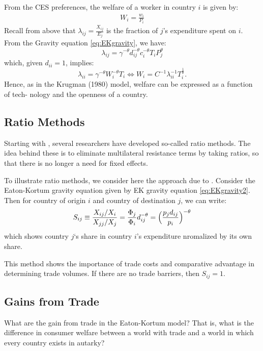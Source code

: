 From the CES preferences, the welfare of a worker in country $i$ is given by:
\begin{gather}
    W_i = \frac{w_i}{P_i} \label{eq:EKwelfare}
\end{gather}
Recall from above that $\lambda_{ij} = \frac{X_{ij}}{E_j}$ is the fraction of $j$'s expenditure spent on $i$.
From the Gravity equation \ref{eq:EKgravity}, we have:
\[
\lambda_{ij} = \gamma^{-\theta} d_{ij}^{-\theta} c_i^{-\theta} T_i P_j^{\theta}
\]
which, given $d_{ii}=1$, implies:
\[
\lambda_{ii} = \gamma^{-\theta} W_i^{-\theta} T_i \Leftrightarrow W_i = C^{-1} \lambda_{ii}^{-1} T_i^{\frac{1}{\theta}}. \label{eq:EKgravity2}
\]
Hence, as in the Krugman (1980)\cite{krugman1980scale} model, welfare can be expressed as a function of tech-
nology and the openness of a country. 

\subsection{Ratio Methods}

Starting with \cite{head1999rationalization}, several researchers have developed so-called
ratio methods. The idea behind these is to eliminate multilateral resistance terms by taking ratios, so
that there is no longer a need for fixed effects. 

To illustrate ratio methods, we consider here the approach due to \cite{romalis2007nafta}.
Consider the Eaton-Kortum gravity equation given by EK gravity equation \ref{eq:EKgravity2}.
Then for country of origin $i$ and country of destination $j$, we can write:
\[
S_{ij} \equiv \frac{X_{ij} / X_i}{X_{jj} / X_j} = \frac{\Phi_j}{\Phi_i} d_{ij}^{-\theta} = \Bigl( \frac{p_j d_{ij}}{p_i} \Bigr)^{-\theta}
\]
which shows country $j$`s share in country $i$'s expenditure nromalized by its own share.

This method shows the importance of trade costs and comparative advantage in determining trade volumes.
If there are no trade barriers, then $S_{ij} =1$.

\subsection{Gains from Trade}


What are the gain from trade in the Eaton-Kortum model? That is, what is the difference in consumer
welfare between a world with trade and a world in which every country exists in autarky?

